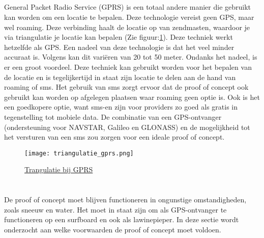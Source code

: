 \subsection{}
General Packet Radio Service (GPRS) is een totaal andere manier die gebruikt kan worden  om een locatie te bepalen. Deze technologie vereist geen GPS, maar wel roaming. Deze verbinding haalt de locatie op van zendmasten, waardoor je via triangulatie je locatie kan bepalen (Zie figuur:\ref{fig:triangulatie_gprs}). Deze techniek werkt hetzelfde als GPS.
\newline
Een nadeel van deze technologie is dat het veel minder accuraat is. Volgens \cite{gprs} kan dit variëren van 20 tot 50 meter. Ondanks het nadeel, is er een groot voordeel. Deze techniek kan gebruikt worden voor het bepalen van de locatie en is tegelijkertijd in staat zijn locatie te delen aan de hand van roaming of sms. Het gebruik van sms zorgt ervoor dat de proof of concept ook gebruikt kan worden op afgelegen plaatsen waar roaming geen optie is. Ook is het een goedkopere optie, want sms-en zijn voor providers zo goed als gratis in tegenstelling tot mobiele data. De combinatie van een GPS-ontvanger (ondersteuning voor NAVSTAR, Galileo en GLONASS) en de mogelijkheid tot het versturen van een sms zou zorgen voor een ideale proof of concept. 
\begin{figure}
    \texttt{[image: triangulatie\_gprs.png]}
    \caption{\href{http://bigpicturequestions.com/how-does-triangulation-help-our-evolution/}{Trangulatie bij GPRS}}
    \label{fig:triangulatie_gprs}
\end{figure}
\pagebreak
\raggedbottom
\section{}
De proof of concept moet blijven functioneren in ongunstige omstandigheden, zoals sneeuw en water. Het moet in staat zijn om als GPS-ontvanger te functioneren op een surfboard en ook als lawinepieper. In deze sectie wordt onderzocht aan welke voorwaarden de proof of concept moet voldoen.
